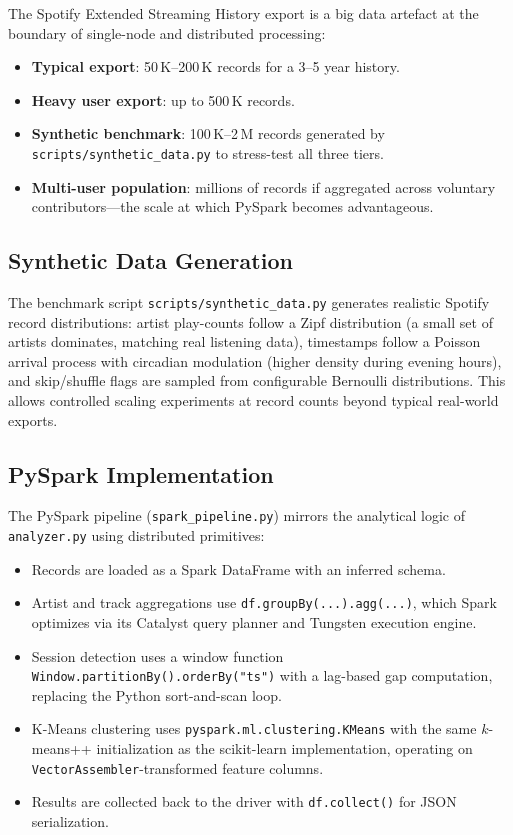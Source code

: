 \documentclass[conference]{IEEEtran}
\begin{document}
The Spotify Extended Streaming History export is a big data artefact at the
boundary of single-node and distributed processing:
\begin{itemize}
  \item \textbf{Typical export}: 50\,K–200\,K records for a 3–5 year history.
  \item \textbf{Heavy user export}: up to 500\,K records.
  \item \textbf{Synthetic benchmark}: 100\,K–2\,M records generated by
        \texttt{scripts/synthetic\_data.py} to stress-test all three tiers.
  \item \textbf{Multi-user population}: millions of records if aggregated across
        voluntary contributors—the scale at which PySpark becomes advantageous.
\end{itemize}

\subsection{Synthetic Data Generation}

The benchmark script \texttt{scripts/synthetic\_data.py} generates realistic
Spotify record distributions: artist play-counts follow a Zipf distribution
(a small set of artists dominates, matching real listening data), timestamps
follow a Poisson arrival process with circadian modulation (higher density
during evening hours), and skip/shuffle flags are sampled from configurable
Bernoulli distributions. This allows controlled scaling experiments at record
counts beyond typical real-world exports.

\subsection{PySpark Implementation}

The PySpark pipeline (\texttt{spark\_pipeline.py}) mirrors the analytical
logic of \texttt{analyzer.py} using distributed primitives:

\begin{itemize}
  \item Records are loaded as a Spark DataFrame with an inferred schema.
  \item Artist and track aggregations use \texttt{df.groupBy(...).agg(...)},
        which Spark optimizes via its Catalyst query planner and Tungsten
        execution engine.
  \item Session detection uses a window function
        \texttt{Window.partitionBy().orderBy("ts")} with a lag-based gap
        computation, replacing the Python sort-and-scan loop.
  \item K-Means clustering uses \texttt{pyspark.ml.clustering.KMeans} with
        the same $k$-means++ initialization as the scikit-learn implementation,
        operating on \texttt{VectorAssembler}-transformed feature columns.
  \item Results are collected back to the driver with \texttt{df.collect()}
        for JSON serialization.
\end{itemize}
\end{document}
